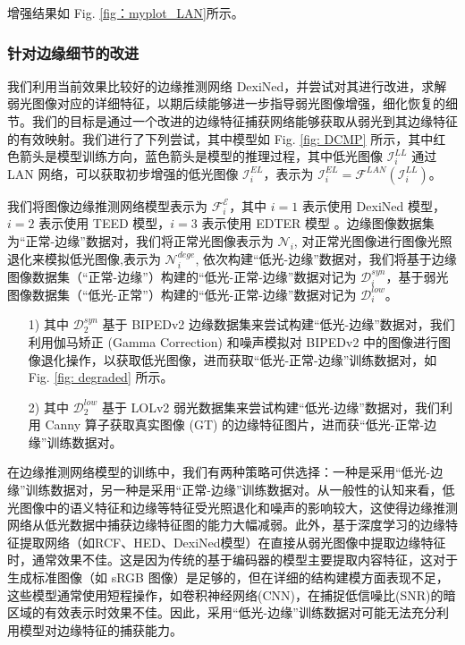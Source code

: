 \documentclass[a4paper]{ctexart}
\begin{document}
		增强结果如 Fig. \ref{fig：myplot_LAN}所示。
		
		\subsubsection{针对边缘细节的改进}
		
		我们利用当前效果比较好的边缘推测网络 DexiNed，并尝试对其进行改进，求解弱光图像对应的详细特征，以期后续能够进一步指导弱光图像增强，细化恢复的细节。我们的目标是通过一个改进的边缘特征捕获网络能够获取从弱光到其边缘特征的有效映射。我们进行了下列尝试，其中模型如 Fig. \ref{fig: DCMP} 所示，其中红色箭头是模型训练方向，蓝色箭头是模型的推理过程，其中低光图像 $\mathcal{I}_{i}^{LL}$ 通过 LAN 网络，可以获取初步增强的低光图像 $\mathcal{I}_{i}^{EL}$，表示为 $\mathcal{I}_{i}^{EL} = \mathcal{F}^{LAN} (\mathcal{I}_{i}^{LL})$。
		
		我们将图像边缘推测网络模型表示为 $\mathcal{F}_{i}^{\mathcal{E}}$，其中 $i=1$ 表示使用 DexiNed \cite{Soria_2023}模型，$i=2$ 表示使用 TEED \cite{soria2023tiny}模型，$i=3$ 表示使用 EDTER \cite{pu2022edter}模型 。边缘图像数据集为“正常-边缘”数据对，我们将正常光图像表示为 $\mathcal{N}_{i}$, 对正常光图像进行图像光照退化来模拟低光图像,表示为 $\mathcal{N}_{i}^{dege}$, 依次构建“低光-边缘”数据对，我们将基于边缘图像数据集（“正常-边缘”）构建的“低光-正常-边缘”数据对记为 $\mathcal{D}_{i}^{syn}$，基于弱光图像数据集（“低光-正常”）构建的“低光-正常-边缘”数据对记为 $\mathcal{D}_{i}^{low}$。
		
		\begin{itemize}
			\item[1)]
			其中 $\mathcal{D}_{2}^{syn}$ 基于 BIPEDv2 边缘数据集来尝试构建“低光-边缘”数据对，我们利用伽马矫正 (Gamma Correction) 和噪声模拟对 BIPEDv2 中的图像进行图像退化操作，以获取低光图像，进而获取“低光-正常-边缘”训练数据对，如 Fig. \ref{fig: degraded} 所示。
			
			\item[2)]
			其中 $\mathcal{D}_{2}^{low}$ 基于 LOLv2 弱光数据集来尝试构建“低光-边缘”数据对，我们利用 Canny 算子获取真实图像 (GT) 的边缘特征图片，进而获“低光-正常-边缘”训练数据对。
		\end{itemize}
		
		在边缘推测网络模型的训练中，我们有两种策略可供选择：一种是采用“低光-边缘”训练数据对，另一种是采用“正常-边缘”训练数据对。从一般性的认知来看，低光图像中的语义特征和边缘等特征受光照退化和噪声的影响较大，这使得边缘推测网络从低光数据中捕获边缘特征图的能力大幅减弱。此外，基于深度学习的边缘特征提取网络（如RCF、HED、DexiNed模型）在直接从弱光图像中提取边缘特征时，通常效果不佳。这是因为传统的基于编码器的模型主要提取内容特征，这对于生成标准图像（如 sRGB 图像）是足够的，但在详细的结构建模方面表现不足，这些模型通常使用短程操作，如卷积神经网络(CNN)，在捕捉低信噪比(SNR)的暗区域的有效表示时效果不佳。因此，采用“低光-边缘”训练数据对可能无法充分利用模型对边缘特征的捕获能力。
		
\end{document}
